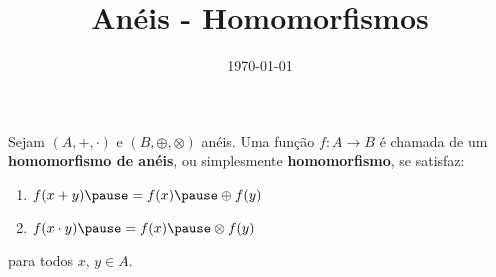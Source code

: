 \documentclass{beamer}
\title{An\'eis - Homomorfismos}
\author[\autor]{\autor}
\institute[\instituto]{\instituto}
\date{\today}
\begin{document}
    \begin{frame}
        \maketitle
    \end{frame}

    
    \begin{frame}
        \begin{definicao}
            Sejam $(A, +, \cdot)$ \pause e $(B, \oplus, \otimes)$ \pause anéis. \pause Uma fun{\c c}{\~a}o $f : A \to B$ \pause é chamada de um \textbf{homomorfismo de anéis}, \pause ou simplesmente \textbf{homomorfismo}, \pause se satisfaz:\pause
            \begin{enumerate}[label={\roman*})]
                \item $f(x + y) \pause = f(x) \pause \oplus f(y)$\pause

                \vspace{.5cm}
                
                \item $f(x \cdot y) \pause = f(x) \pause \otimes f(y)$\pause
                
                \vspace{.5cm}
            \end{enumerate}
            para todos $x$, $y \in A$.\pause
        \end{definicao}
    \end{frame}
\end{document}
